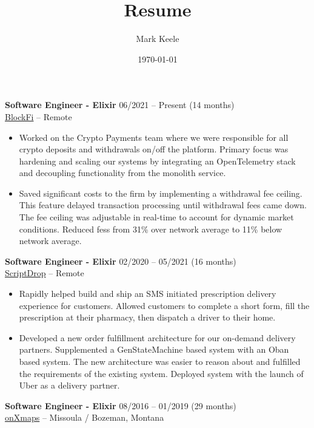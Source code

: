 \documentclass[12pt,letterpaper]{article}
\author{Mark Keele}
\title{Resume}
\date{\today}
\begin{document}
\noindent\textbf{Software Engineer - Elixir}
\hfill{06/2021 -- Present (14 months)} \\
\href{https://blockfi.com/}{BlockFi} -- Remote

\begin{itemize}

  \item Worked on the Crypto Payments team where we were responsible for all crypto deposits and withdrawals on/off the platform. Primary focus was hardening and scaling our systems by integrating an OpenTelemetry stack and decoupling functionality from the monolith service.

  \item Saved significant costs to the firm by implementing a withdrawal fee ceiling. This feature delayed transaction processing until withdrawal fees came down. The fee ceiling was adjustable in real-time to account for dynamic market conditions. Reduced fess from 31\% over network average to 11\% below network average.

\end{itemize}

\noindent\textbf{Software Engineer - Elixir}
\hfill{02/2020 -- 05/2021 (16 months)} \\
\href{https://scriptdrop.co/}{ScriptDrop} -- Remote

\begin{itemize}

  \item Rapidly helped build and ship an SMS initiated prescription delivery experience for customers. Allowed customers to complete a short form, fill the prescription at their pharmacy, then dispatch a driver to their home.

  \item Developed a new order fulfillment architecture for our on-demand delivery partners. Supplemented a GenStateMachine based system with an Oban based system. The new architecture was easier to reason about and fulfilled the requirements of the existing system. Deployed system with the launch of Uber as a delivery partner.

\end{itemize}

\noindent\textbf{Software Engineer - Elixir}
\hfill{08/2016 -- 01/2019 (29 months)} \\
\href{https://www.onxmaps.com/}{onXmaps} -- Missoula / Bozeman, Montana
\end{document}
